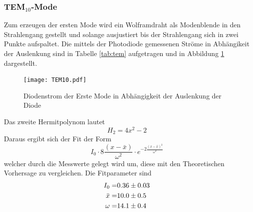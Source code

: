 \subsubsection{TEM$_\text{10}$-Mode}
Zum erzeugen der ersten Mode wird ein Wolframdraht als Modenblende in den Strahlengang gestellt und solange ausjustiert bis der Strahlengang sich in zwei Punkte aufspaltet. Die mittels der Photodiode gemessenen Ströme in Abhängikeit der Auslenkung sind in Tabelle \ref{tab:tem} aufgetragen und in Abbildung \ref{fig:TEM10} dargestellt.
\begin{figure}
  \centering
  \texttt{[image: TEM10.pdf]}
  \caption{Diodenstrom der Erste Mode in Abhängigkeit der Auslenkung der Diode}
  \label{fig:TEM10}
\end{figure}
Das zweite Hermitpolynom lautet
\begin{equation}
  H_2 = 4x^2 - 2
  \label{eqn:Herm}
\end{equation}
Daraus ergibt sich der Fit der Form 
\begin{equation}
  I_0 \cdot 8 \frac{\left( x - \bar{x} \right)}{\omega^2} \cdot e^{-2 \frac{\left( x - \bar{x} \right)^2}{\omega^2}}
  \label{eqn:TEM10}
\end{equation}
welcher durch die Messwerte gelegt wird um, diese mit den Theoretischen Vorhersage zu vergleichen. Die Fitparameter sind
\begin{eqnarray}
  I_0 =& \num{0.36 +- 0.03}	\\
  \bar{x} =& \num{10.0 +- 0.5} \\
  \omega =& \num{14.1 +- 0.4}
\end{eqnarray}

